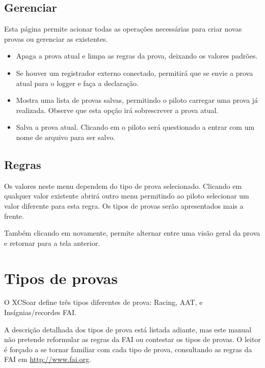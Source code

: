 \subsection*{Gerenciar}
Esta página permite acionar todas as operações necessárias para criar novas provas ou gerenciar
as existentes.


\begin{itemize}
\item [\bmenuw{Nova Prova}] Apaga a prova atual e limpa as regras da prova, deixando os valores padrões.
\item [\bmenuw{Declarar}] Se houver um registrador externo conectado, permitirá que se envie a prova atual para o logger e faça a declaração.
\item [\bmenuw{Procurar}] Mostra uma lista de provas salvas, permitindo o piloto carregar uma prova já realizada.  Observe que esta opção irá sobrescrever a prova atual.
\item [\bmenuw{Salvar}] Salva a prova atual.  Clicando em 
   o piloto será questionado a entrar com um nome de arquivo para ser salvo.
\end{itemize}

\subsection*{Regras}
Os valores neste menu dependem do tipo de prova selecionado.  Clicando 
 em qualquer valor existente abrirá outro menu permitindo ao piloto selecionar um valor diferente para esta regra.  Os tipos de provas serão apresentados mais a frente.

Também clicando em  novamente, permite alternar entre uma visão geral da prova e retornar para a tela anterior.  

\section{Tipos de provas}
O XCSoar define três tipos diferentes de prova: Racing, AAT, e Insígnias/recordes FAI.

A descrição detalhada dos tipos de prova está listada adiante, mas este manual não pretende reformular as regras da FAI ou contestar os tipos de provas.  O leitor é forçado a se tornar familiar com cada tipo de prova, consultando as regras da FAI em \url{http://www.fai.org}. 


